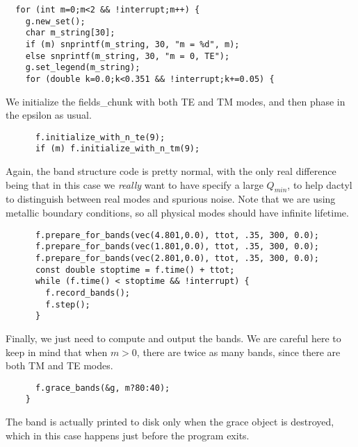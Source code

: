 \begin{verbatim}
  for (int m=0;m<2 && !interrupt;m++) {
    g.new_set();
    char m_string[30];
    if (m) snprintf(m_string, 30, "m = %d", m);
    else snprintf(m_string, 30, "m = 0, TE");
    g.set_legend(m_string);
    for (double k=0.0;k<0.351 && !interrupt;k+=0.05) {
\end{verbatim}
\begin{comment}
      printf("Working on k of %
      fields_chunk f(&vac, m);
      f.use_bloch(k);
      f.verbose(1);
      f.phase_in_material(&ma, 1000);
\end{comment}
We initialize the fields_chunk with both TE and TM modes, and then phase in the
epsilon as usual.
\begin{verbatim}
      f.initialize_with_n_te(9);
      if (m) f.initialize_with_n_tm(9);
\end{verbatim}
\begin{comment}
      while (f.is_phasing() && !interrupt) f.step();
\end{comment}
Again, the band structure code is pretty normal, with the only real
difference being that in this case we \emph{really} want to have specify a
large $Q_{min}$, to help dactyl to distinguish between real modes and
spurious noise.  Note that we are using metallic boundary conditions, so
all physical modes should have infinite lifetime.
\begin{verbatim}
      f.prepare_for_bands(vec(4.801,0.0), ttot, .35, 300, 0.0);
      f.prepare_for_bands(vec(1.801,0.0), ttot, .35, 300, 0.0);
      f.prepare_for_bands(vec(2.801,0.0), ttot, .35, 300, 0.0);
      const double stoptime = f.time() + ttot;
      while (f.time() < stoptime && !interrupt) {
        f.record_bands();
        f.step();
      }
\end{verbatim}
Finally, we just need to compute and output the bands.  We are careful here
to keep in mind that when $m > 0$, there are twice as many bands, since
there are both TM and TE modes.
\begin{verbatim}
      f.grace_bands(&g, m?80:40);
    }
\end{verbatim}
The band is actually printed to disk only when the grace object is
destroyed, which in this case happens just before the program exits.
\begin{comment}
  }
}
\end{comment}
